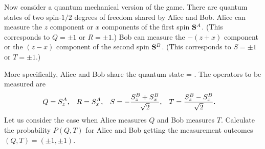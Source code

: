 \begin{problem}
	Now consider a quantum mechanical version of the game.  There are quantum states of two spin-$1/2$ degrees of freedom shared by Alice and Bob.  Alice can measure the $z$ component or $x$ components of the first spin $\vb{S}^A$.  (This corresponds to $Q = \pm1$ or $R = \pm1$.)  Bob can measure the $-(z+x)$ component or the $(z-x)$ component of the second spin $\vb{S}^B$.  (This corresponds to $S = \pm1$ or $T = \pm1$.)
	
	More specifically, Alice and Bob share the quantum state
	\beq
		\kpsi = .
	\eeq
	The operators to be measured are
	\begin{align*}
		Q &= S_z^A, &
		R &= S_x^A, &
		S &= -\frac{S_z^B + S_x^B}{\sqrt{2}}, &
		T &= \frac{S_z^B - S_x^B}{\sqrt{2}}.
	\end{align*}
	Let us consider the case when Alice measures $Q$ and Bob measures $T$.  Calculate the probability $P(Q, T)$ for Alice and Bob getting the measurement outcomes $(Q, T) = (\pm1, \pm1)$.
\end{problem}

